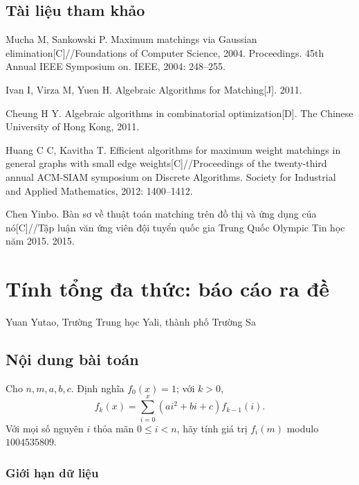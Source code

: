 \documentclass[11pt]{article}
\begin{document}
\subsection*{Tài liệu tham khảo}

\begin{enumerate}[label={[\arabic*]}]
  \item Mucha M, Sankowski P. Maximum matchings via Gaussian
  elimination[C]//Foundations of Computer Science, 2004. Proceedings. 45th
  Annual IEEE Symposium on. IEEE, 2004: 248--255.

  \item Ivan I, Virza M, Yuen H. Algebraic Algorithms for Matching[J]. 2011.

  \item Cheung H Y. Algebraic algorithms in combinatorial optimization[D]. The
  Chinese University of Hong Kong, 2011.

  \item Huang C C, Kavitha T. Efficient algorithms for maximum weight
  matchings in general graphs with small edge weights[C]//Proceedings of the
  twenty-third annual ACM-SIAM symposium on Discrete Algorithms. Society for
  Industrial and Applied Mathematics, 2012: 1400--1412.

  \item Chen Yinbo. Bàn sơ về thuật toán matching trên đồ thị và ứng dụng
  của nó[C]//Tập luận văn ứng viên đội tuyển quốc gia Trung Quốc Olympic Tin
  học năm 2015. 2015.
\end{enumerate}

\section{Tính tổng đa thức: báo cáo ra đề}

\begin{center}
Yuan Yutao, Trường Trung học Yali, thành phố Trường Sa
\end{center}

\subsection{Nội dung bài toán}

Cho \(n,m,a,b,c\). Định nghĩa \(f_0(x)=1\); với \(k>0\),
\[
  f_k(x)=\sum_{i=0}^{x}(ai^2+bi+c)f_{k-1}(i).
\]
Với mọi số nguyên \(i\) thỏa mãn \(0\le i<n\), hãy tính giá trị
\(f_i(m)\) modulo \(1004535809\).

\subsubsection{Giới hạn dữ liệu}
\end{document}
